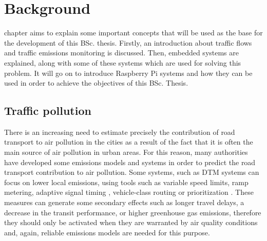 
\chapter{Background}
\label{chap:background}

 chapter aims to explain some important concepts that will be used as the base for the development of this \ac{BSc.} thesis. Firstly, an introduction about traffic flows and traffic emissions monitoring is discussed. Then, embedded systems are explained, along with some of these systems which are used for solving this problem. It will go on to introduce Raspberry Pi systems and how they can be used in order to achieve the objectives of this \ac{BSc.} Thesis.

\section{Traffic pollution}

There is an increasing need to estimate precisely the contribution of road transport to air pollution in the cities as a result of the fact that it is often the main source of air pollution in urban areas. For this reason, many authorities have developed some emissions models and systems in order to predict the road transport contribution to air pollution. Some systems, such as \ac{DTM} systems can focus on lower local emissions, using tools such as variable speed limits, ramp metering, adaptive signal timing \cite{MK10}, vehicle-class routing or prioritization \cite{ZDHB09}. These measures can generate some secondary effects such as longer travel delays, a decrease in the transit performance, or higher greenhouse gas emissions, therefore they should only be activated when they are warranted by air quality conditions \cite{EMA09} and, again, reliable emissions models are needed for this purpose. 

